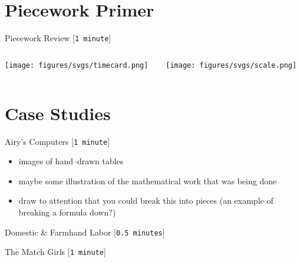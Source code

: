 \documentclass{beamer}
\begin{document}
\section{Piecework Primer}
\begin{frame}{Piecework Review
                                                                                [\texttt{1 minute}]
}

  \begin{columns} %
    \begin{column}{0.5\textwidth}
      \texttt{[image: figures/svgs/timecard.png]}
    \end{column}
    \begin{column}{0.5\textwidth}
      \texttt{[image: figures/svgs/scale.png]}
    \end{column}
  \end{columns}
  
\end{frame}



\section{Case Studies}
\begin{frame}{Airy's Computers
                                                                                [\texttt{1 minute}]
    }
\begin{itemize}
  \item images of hand--drawn tables
  \item maybe some illustration of the mathematical work that was being done
  \item draw to attention that you could break this into pieces
        (an example of breaking a formula down?)
\end{itemize}
\end{frame}

\begin{frame}{Domestic \& Farmhand Labor
                                                                                [\texttt{0.5 minutes}]
}
\end{frame}


\begin{frame}{The Match Girls
                                                                                [\texttt{1 minute}]
}
\end{frame}
\end{document}
